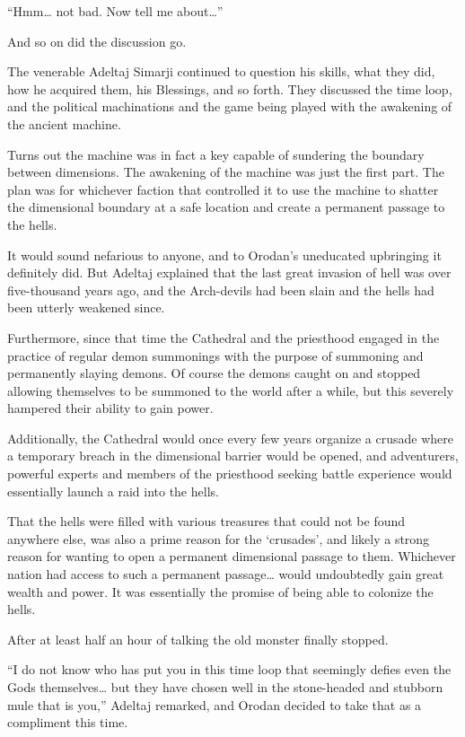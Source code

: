 \documentclass[a4paper,10pt]{book}
\begin{document}
“Hmm… not bad. Now tell me about…”\par
And so on did the discussion go.\par
The venerable Adeltaj Simarji continued to question his skills, what they did, how he acquired them, his Blessings, and so forth. They discussed the time loop, and the political machinations and the game being played with the awakening of the ancient machine.\par
Turns out the machine was in fact a key capable of sundering the boundary between dimensions. The awakening of the machine was just the first part. The plan was for whichever faction that controlled it to use the machine to shatter the dimensional boundary at a safe location and create a permanent passage to the hells.\par
It would sound nefarious to anyone, and to Orodan’s uneducated upbringing it definitely did. But Adeltaj explained that the last great invasion of hell was over five-thousand years ago, and the Arch-devils had been slain and the hells had been utterly weakened since.\par
Furthermore, since that time the Cathedral and the priesthood engaged in the practice of regular demon summonings with the purpose of summoning and permanently slaying demons. Of course the demons caught on and stopped allowing themselves to be summoned to the world after a while, but this severely hampered their ability to gain power.\par
Additionally, the Cathedral would once every few years organize a crusade where a temporary breach in the dimensional barrier would be opened, and adventurers, powerful experts and members of the priesthood seeking battle experience would essentially launch a raid into the hells.\par
That the hells were filled with various treasures that could not be found anywhere else, was also a prime reason for the ‘crusades’, and likely a strong reason for wanting to open a permanent dimensional passage to them. Whichever nation had access to such a permanent passage… would undoubtedly gain great wealth and power. It was essentially the promise of being able to colonize the hells.\par
After at least half an hour of talking the old monster finally stopped.\par
“I do not know who has put you in this time loop that seemingly defies even the Gods themselves… but they have chosen well in the stone-headed and stubborn mule that is you,” Adeltaj remarked, and Orodan decided to take that as a compliment this time.\par
\end{document}
